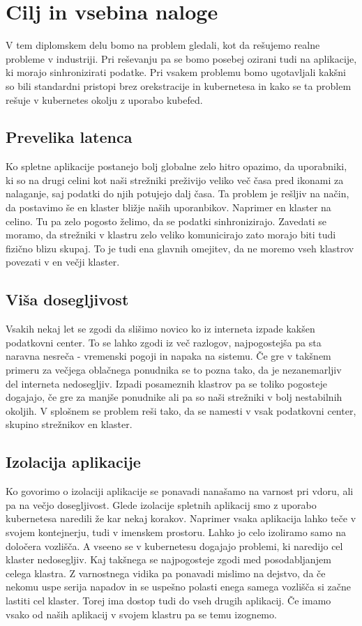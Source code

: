 \documentclass[a4paper, 12pt]{book}
\begin{document}
\section{Cilj in vsebina naloge}
V tem diplomskem delu bomo na problem gledali, kot da rešujemo realne probleme v industriji. 
Pri reševanju pa se bomo posebej ozirani tudi na aplikacije, ki morajo sinhronizirati podatke.
Pri vsakem problemu bomo ugotavljali kakšni so bili standardni pristopi brez orekstracije in kubernetesa in kako se ta problem rešuje v kubernetes okolju z uporabo kubefed.


\subsection{Prevelika latenca}
Ko spletne aplikacije postanejo bolj globalne zelo hitro opazimo, da uporabniki, ki so na drugi celini kot naši strežniki preživijo veliko več časa pred ikonami za nalaganje, saj podatki do njih potujejo dalj časa.
Ta problem je rešljiv na način, da postavimo še en klaster bližje naših uporanbikov.
Naprimer en klaster na celino. Tu pa zelo pogosto želimo, da se podatki sinhronizirajo.
Zavedati se moramo, da strežniki v klastru zelo veliko komunicirajo zato morajo biti tudi fizično blizu skupaj. 
To je tudi ena glavnih omejitev, da ne moremo vseh klastrov povezati v en večji klaster.


\subsection{Viša dosegljivost}
Vsakih nekaj let se zgodi da slišimo novico ko iz interneta izpade kakšen podatkovni center. 
To se lahko zgodi iz več razlogov, najpogostejša pa sta naravna nesreča - vremenski pogoji in napaka na sistemu.
Če gre v takšnem primeru za večjega oblačnega ponudnika se to pozna tako, da je nezanemarljiv del interneta nedosegljiv.
Izpadi posameznih klastrov pa se toliko pogosteje dogajajo, če gre za manjše ponudnike ali pa so naši strežniki v bolj nestabilnih okoljih. 
V splošnem se problem reši tako, da se namesti v vsak podatkovni center, skupino strežnikov en klaster.

\subsection{Izolacija aplikacije}
Ko govorimo o izolaciji aplikacije se ponavadi nanašamo na varnost pri vdoru, ali pa na večjo dosegljivost.
Glede izolacije spletnih aplikacij smo z uporabo kubernetesa naredili že kar nekaj korakov.
Naprimer vsaka aplikacija lahko teče v svojem kontejnerju, tudi v imenskem prostoru.
Lahko jo celo izoliramo samo na določera vozlišča.
A vseeno se v kubernetesu dogajajo problemi, ki naredijo cel klaster nedosegljiv.
Kaj takšnega se najpogosteje zgodi med posodabljanjem celega klastra.
Z varnostnega vidika pa ponavadi mislimo na dejstvo, da če nekomu uspe serija napadov in se uspešno polasti enega samega vozlišča si začne lastiti cel klaster.
Torej ima dostop tudi do vseh drugih aplikacij.
Če imamo vsako od naših aplikacij v svojem klastru pa se temu izognemo.
\end{document}
